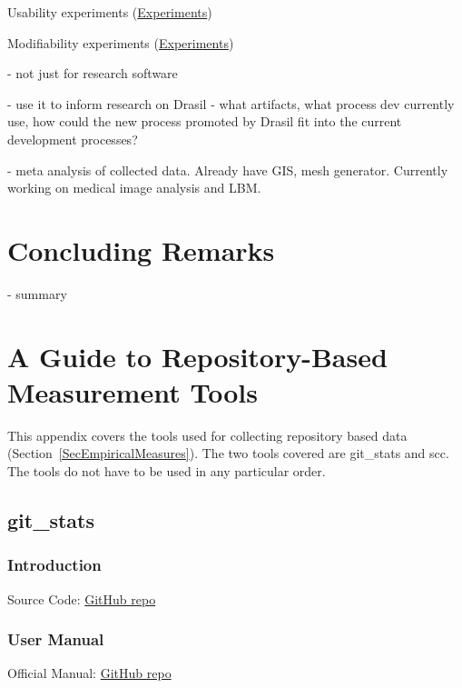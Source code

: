 \documentclass[letterpaper,cleveref]{lipics-v2019}
\begin{document}
Usability experiments (\href{https://github.com/smiths/AIMSS/blob/master/StateOfPractice/Methodology/Experiments.pdf}{Experiments})
  
Modifiability experiments (\href{https://github.com/smiths/AIMSS/blob/master/StateOfPractice/Methodology/Experiments.pdf}{Experiments})

- not just for research software

- use it to inform research on Drasil - what artifacts, what process dev
currently use, how could the new process promoted by Drasil fit into the current
development processes?

- meta analysis of collected data.  Already have GIS, mesh generator.  Currently
working on medical image analysis and LBM.

\section{Concluding Remarks} \label{SecConcludingRemarks}

- summary 

\newpage

\appendix

\section{A Guide to Repository-Based Measurement Tools} \label{SecRepoTools}

This appendix covers the tools used for collecting repository based data
(Section~\ref{SecEmpiricalMeasures}).  The two tools covered are git\_stats and
scc.  The tools do not have to be used in any particular order.

\subsection{git\_stats}

\subsubsection{Introduction}

Source Code: \href{https://github.com/tomgi/git_stats}{GitHub repo}

\subsubsection{User Manual} \label{git_stats_manual}

Official Manual: \href{https://github.com/tomgi/git_stats}{GitHub repo}
\end{document}
